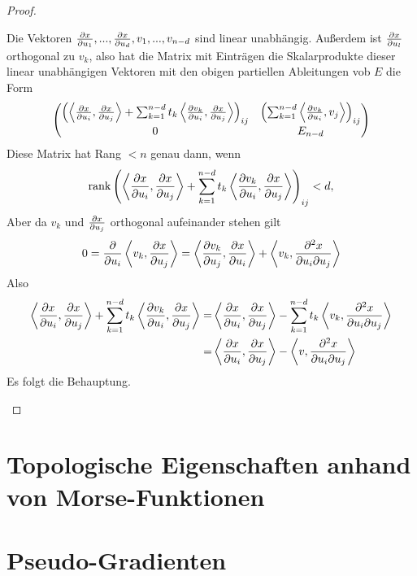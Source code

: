 \begin{proof}
\begin{smallproof}
        Die Vektoren $ \pderive[x]{u_1}, ..., \pderive[x]{u_d}, v_1, ..., v_{n - d}$ sind linear
        unabhängig. Außerdem ist $\pderive[x]{u_l}$ orthogonal zu $v_k$, also hat die Matrix mit 
        Einträgen die Skalarprodukte dieser linear unabhängigen Vektoren mit den obigen partiellen
        Ableitungen vob $E$ die Form 
        \[
            \begin{pmatrix}
                \left( \left\langle \pderive[x]{u_i}, \pderive[x]{u_j} \right\rangle + 
                    \sum_{k = 1}^{n - d} t_k 
                    \left\langle \pderive[v_k]{u_i} , \pderive[x]{u_j} \right\rangle \right)_{ij} &
                \left( \sum_{k = 1}^{n - d} 
                    \left\langle \pderive[v_k]{u_i}, v_j \right\rangle \right)_{ij} \\
                0 & E_{n - d}
            \end{pmatrix}
        \]
        Diese Matrix hat Rang $< n$ genau dann, wenn 
        \[ \rank \left( \left\langle \pderive[x]{u_i}, \pderive[x]{u_j} \right\rangle + 
            \sum_{k = 1}^{n - d} t_k 
            \left\langle \pderive[v_k]{u_i} , \pderive[x]{u_j} \right\rangle \right)_{ij} < d 
        , \]
        Aber da $v_k$ und $\pderive[x]{u_j}$ orthogonal aufeinander stehen gilt 
        \[ 
            0 = \pderive{u_i} \left\langle v_k, \pderive[x]{u_j} \right\rangle
            = \left\langle \pderive[v_k]{u_j}, \pderive[x]{u_i} \right\rangle 
            + \left\langle v_k, \pdderive[x]{u_i}{u_j} \right\rangle
        \]
        Also 
        \begin{align*}
            \left\langle \pderive[x]{u_i}, \pderive[x]{u_j} \right\rangle + 
                    \sum_{k = 1}^{n - d} t_k 
                    \left\langle \pderive[v_k]{u_i} , \pderive[x]{u_j} \right\rangle
            = & \left\langle \pderive[x]{u_i}, \pderive[x]{u_j} \right\rangle - 
            \sum_{k = 1}^{n - d} t_k 
            \left\langle v_k , \pdderive[x]{u_i}{u_j} \right\rangle \\
            = & \left\langle \pderive[x]{u_i}, \pderive[x]{u_j} \right\rangle - 
            \left\langle v , \pdderive[x]{u_i}{u_j} \right\rangle
        \end{align*}
        Es folgt die Behauptung.
    \end{smallproof}
\end{proof}

\section{Topologische Eigenschaften anhand von Morse-Funktionen}

\section{Pseudo-Gradienten}
